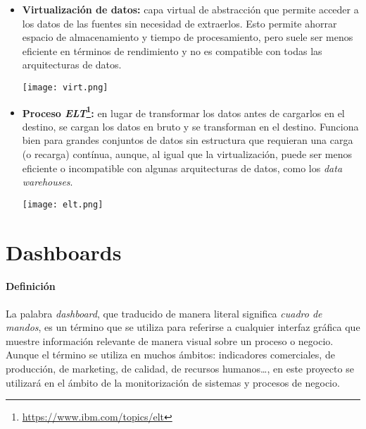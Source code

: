 \begin{itemize}
	\item \textbf{Virtualización de datos:} capa virtual de abstracción que permite acceder a los datos de las
		fuentes sin necesidad de extraerlos. Esto permite ahorrar espacio de almacenamiento y tiempo de procesamiento,
		pero suele ser menos eficiente en términos de rendimiento y no es compatible con todas las arquitecturas de
		datos.

		\begin{minipage}{\linewidth}
			\centering
			\texttt{[image: virt.png]}
		\end{minipage}
	\item \textbf{Proceso \textit{ELT}\footnote{\url{https://www.ibm.com/topics/elt}}:} en lugar de transformar
		los datos antes de cargarlos en el destino, se cargan los datos en bruto y se transforman en el destino.
		Funciona bien para grandes conjuntos de datos sin estructura que requieran una carga (o recarga) contínua,
		aunque, al igual que la virtualización, puede ser menos eficiente o incompatible con algunas arquitecturas
		de datos, como los \textit{data warehouses}.

		\begin{minipage}{\linewidth}
			\centering
			\texttt{[image: elt.png]}
		\end{minipage}
\end{itemize}


\newpage{}
\section{Dashboards}\label{sec:dashboards}
\paragraph{Definición}
La palabra \textit{dashboard}, que traducido de manera literal significa \textit{cuadro de mandos},
es un término que se utiliza para referirse a cualquier interfaz gráfica que muestre información
relevante de manera visual sobre un proceso o negocio. Aunque el término se utiliza en
muchos ámbitos: indicadores comerciales, de producción, de marketing, de calidad, de recursos
humanos\ldots, en este proyecto se utilizará en el ámbito de la monitorización de sistemas y
procesos de negocio.

